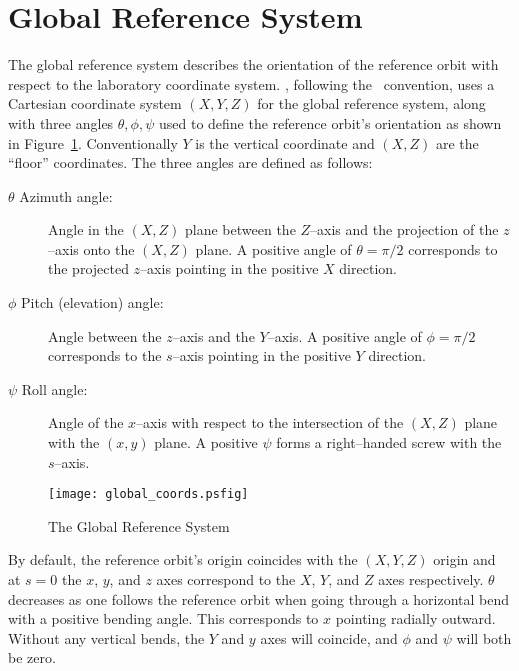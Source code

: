 \section{Global Reference System}
\label{s:global}

The global reference system describes the orientation of the reference
orbit with respect to the laboratory coordinate system.  \bmad,
following the \mad\ convention, uses a Cartesian coordinate system
$(X, Y, Z)$ for the global reference system, along with three angles
$\theta, \phi, \psi$ used to define the reference orbit's orientation
as shown in Figure~\ref{f:global_coords}. Conventionally $Y$ is the
vertical coordinate and $(X, Z)$ are the ``floor'' coordinates.  The
three angles are defined as follows:
\begin{description}
\item[$\theta$ Azimuth angle:] Angle in the $(X, Z)$ plane 
between the $Z$--axis and the projection of the $z$--axis onto the
$(X, Z)$ plane. A positive angle of $\theta = \pi/2$ corresponds to the
projected $z$--axis pointing in the positive $X$ direction.
\item[$\phi$ Pitch (elevation) angle:] Angle between the $z$--axis 
and the $Y$--axis. A positive angle of $\phi = \pi/2$ corresponds to
the $s$--axis pointing in the positive $Y$ direction.
\item[$\psi$ Roll angle:] Angle of the $x$--axis with respect 
to the intersection of the $(X, Z)$ plane with the $(x, y)$ plane. A
positive $\psi$ forms a right--handed screw with the $s$--axis.
\end{description}

\begin{figure}
\centering
\texttt{[image: global\_coords.psfig]}
\caption{The Global Reference System}
\label{f:global_coords}
\end{figure}

By default, the reference orbit's origin coincides with the
$(X, Y, Z)$ origin and at $s = 0$ the $x$, $y$, and $z$ axes
correspond to the $X$, $Y$, and $Z$ axes respectively. $\theta$
decreases as one follows the reference orbit when going through a
horizontal bend with a positive bending angle. This corresponds to $x$
pointing radially outward. Without any vertical bends, the $Y$ and $y$
axes will coincide, and $\phi$ and $\psi$ will both be zero.

\vfill


